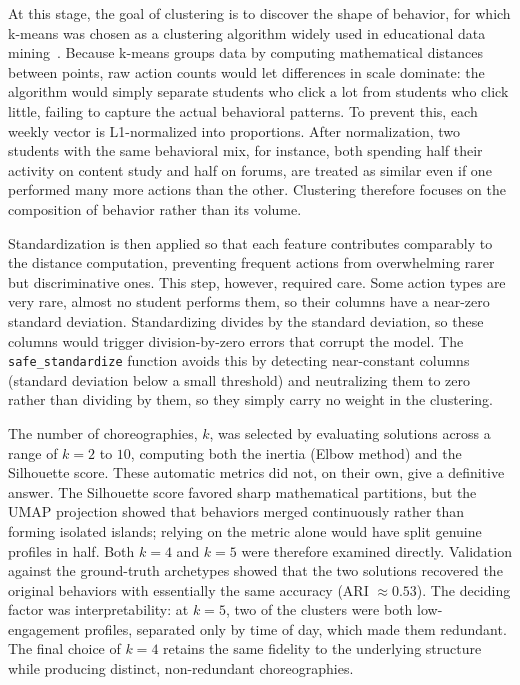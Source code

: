 \label{sec:pattern-discovery}
At this stage, the goal of clustering is to discover the shape of behavior, for which k-means was chosen as a clustering algorithm widely used in educational data mining~\cite{romero_edm_survey}. Because k-means groups data by computing mathematical distances between points, raw action counts would let differences in scale dominate: the algorithm would simply separate students who click a lot from students who click little, failing to capture the actual behavioral patterns. To prevent this, each weekly vector is L1-normalized into proportions. After normalization, two students with the same behavioral mix, for instance, both spending half their activity on content study and half on forums, are treated as similar even if one performed many more actions than the other. Clustering therefore focuses on the composition of behavior rather than its volume.

Standardization is then applied so that each feature contributes comparably to the distance computation, preventing frequent actions from overwhelming rarer but discriminative ones. This step, however, required care. Some action types are very rare, almost no student performs them, so their columns have a near-zero standard deviation. Standardizing divides by the standard deviation, so these columns would trigger division-by-zero errors that corrupt the model. The \texttt{safe\_standardize} function avoids this by detecting near-constant columns (standard deviation below a small threshold) and neutralizing them to zero rather than dividing by them, so they simply carry no weight in the clustering.

The number of choreographies, $k$, was selected by evaluating solutions across a range of $k=2$ to $10$, computing both the inertia (Elbow method) and the Silhouette score. These automatic metrics did not, on their own, give a definitive answer. The Silhouette score favored sharp mathematical partitions, but the UMAP projection showed that behaviors merged continuously rather than forming isolated islands; relying on the metric alone would have split genuine profiles in half. Both $k=4$ and $k=5$ were therefore examined directly. Validation against the ground-truth archetypes showed that the two solutions recovered the original behaviors with essentially the same accuracy (ARI $\approx 0.53$). The deciding factor was interpretability: at $k=5$, two of the clusters were both low-engagement profiles, separated only by time of day, which made them redundant. The final choice of $k=4$ retains the same fidelity to the underlying structure while producing distinct, non-redundant choreographies.

